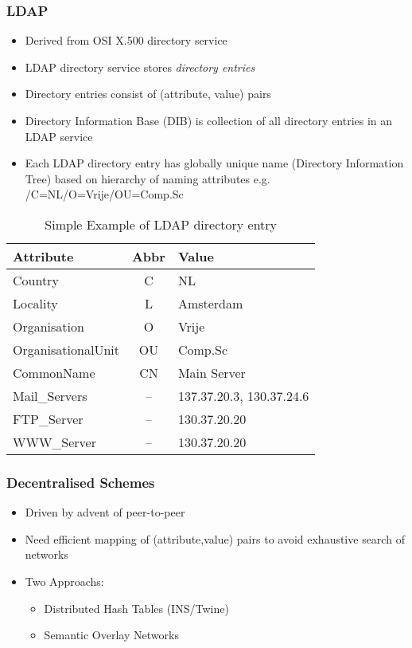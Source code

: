 \subsubsection{LDAP}
\begin{itemize}
	\item Derived from OSI X.500 directory service
	\item LDAP directory service stores \textit{directory entries}
	\item Directory entries consist of (attribute, value) pairs
	\item Directory Information Base (DIB) is collection of all directory entries in an LDAP service
	\item Each LDAP directory entry has globally unique name (Directory Information Tree) based on hierarchy of naming attributes
	\subitem e.g. /C=NL/O=Vrije/OU=Comp.Sc	
\end{itemize}
\begin{table}[H]
	\centering
	\caption{Simple Example of LDAP directory entry}
	\begin{tabular}{lc|l}
		\textbf{Attribute} & \textbf{Abbr} & \textbf{Value}\\\hline
		Country & C & NL\\
		Locality & L & Amsterdam\\
		Organisation & O & Vrije\\
		OrganisationalUnit & OU & Comp.Sc\\
		CommonName & CN & Main Server\\
		Mail\_Servers & -- & 137.37.20.3, 130.37.24.6\\
		FTP\_Server & -- & 130.37.20.20\\
		WWW\_Server & -- & 130.37.20.20	
	\end{tabular}
\end{table}

\subsubsection{Decentralised Schemes}
\begin{itemize}
	\item Driven by advent of peer-to-peer
	\item Need efficient mapping of (attribute,value) pairs to avoid exhaustive search of networks
	\item Two Approachs:
	\begin{itemize}
		\item Distributed Hash Tables (INS/Twine)
		\item Semantic Overlay Networks
	\end{itemize}
\end{itemize}

